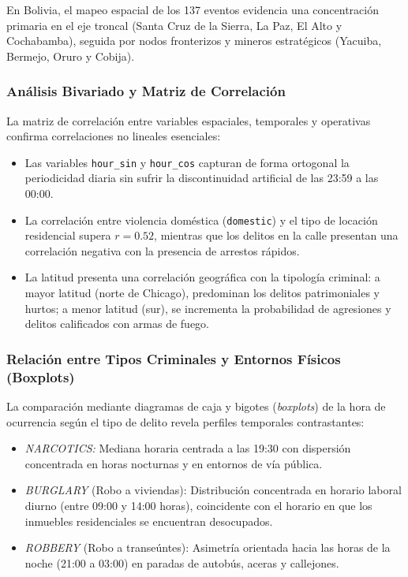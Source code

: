 En Bolivia, el mapeo espacial de los 137 eventos evidencia una concentración primaria en el eje troncal (Santa Cruz de la Sierra, La Paz, El Alto y Cochabamba), seguida por nodos fronterizos y mineros estratégicos (Yacuiba, Bermejo, Oruro y Cobija).

\subsubsection{Análisis Bivariado y Matriz de Correlación}

La matriz de correlación entre variables espaciales, temporales y operativas confirma correlaciones no lineales esenciales:
\begin{itemize}
    \item Las variables \texttt{hour\_sin} y \texttt{hour\_cos} capturan de forma ortogonal la periodicidad diaria sin sufrir la discontinuidad artificial de las 23:59 a las 00:00.
    \item La correlación entre violencia doméstica (\texttt{domestic}) y el tipo de locación residencial supera $r = 0.52$, mientras que los delitos en la calle presentan una correlación negativa con la presencia de arrestos rápidos.
    \item La latitud presenta una correlación geográfica con la tipología criminal: a mayor latitud (norte de Chicago), predominan los delitos patrimoniales y hurtos; a menor latitud (sur), se incrementa la probabilidad de agresiones y delitos calificados con armas de fuego.
\end{itemize}

\subsubsection{Relación entre Tipos Criminales y Entornos Físicos (Boxplots)}

La comparación mediante diagramas de caja y bigotes (\textit{boxplots}) de la hora de ocurrencia según el tipo de delito revela perfiles temporales contrastantes:
\begin{itemize}
    \item \textit{NARCOTICS:} Mediana horaria centrada a las 19:30 con dispersión concentrada en horas nocturnas y en entornos de vía pública.
    \item \textit{BURGLARY} (Robo a viviendas): Distribución concentrada en horario laboral diurno (entre 09:00 y 14:00 horas), coincidente con el horario en que los inmuebles residenciales se encuentran desocupados.
    \item \textit{ROBBERY} (Robo a transeúntes): Asimetría orientada hacia las horas de la noche (21:00 a 03:00) en paradas de autobús, aceras y callejones.
\end{itemize}

